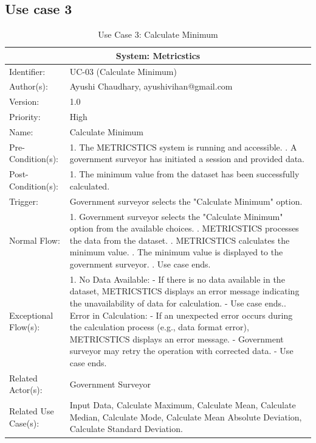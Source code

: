 
\begin{table}[h]
\subsection*{Use case 3}
\begin{tabular}{ | p{4cm} | p{10cm} | }
 \hline
 \multicolumn{2}{|c|}{System: Metricstics} \\
 \hline
 Identifier: & UC-03 (Calculate Minimum) \\
 \hline
 Author(s): & Ayushi Chaudhary, ayushivihan@gmail.com    \\
 \hline
 Version: & 1.0	\\
 \hline
 Priority: & High	\\
 \hline
 Name: & Calculate Minimum  \\
 \hline
 Pre-Condition(s):  & {1. The METRICSTICS system is running and accessible. \newline 2. A government surveyor has initiated a session and provided data.  }\\
 \hline
 Post-Condition(s):  & {1. The minimum value from the dataset has been successfully calculated. }\\
 \hline
 Trigger: & Government surveyor selects the "Calculate Minimum" option. \\
 \hline
 Normal Flow:  & {1. Government surveyor selects the "Calculate Minimum" option from the available choices. \newline 2. METRICSTICS processes the data from the dataset. \newline 3. METRICSTICS calculates the minimum value. \newline 4. The minimum value is displayed to the government surveyor. \newline 5. Use case ends.}\\
 \hline
 Exceptional Flow(s):  & {1. No Data Available: \newline
   - If there is no data available in the dataset, METRICSTICS displays an error message indicating the unavailability of data for calculation.\newline
   - Use case ends.\newline
   2. Error in Calculation: \newline
   - If an unexpected error occurs during the calculation process (e.g., data format error), METRICSTICS displays an error message. \newline
   - Government surveyor may retry the operation with corrected data. \newline
   - Use case ends.}\\
 \hline
 Related Actor(s): & Government Surveyor\\
 \hline
 Related Use Case(s): & Input Data, Calculate Maximum, Calculate Mean, Calculate Median, Calculate Mode, Calculate Mean Absolute Deviation, Calculate Standard Deviation.\\
 \hline
 \end{tabular}
\renewcommand{\thetable}{\arabic{table}}
\caption{Use Case 3: Calculate Minimum}
\label{tab:table1}
\end{table}

